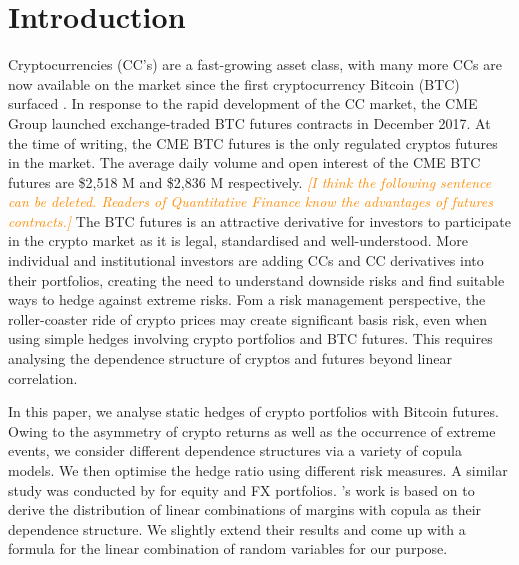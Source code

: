 \documentclass[11pt,a4paper,english]{article}
\providecommand{\natp}[1]{\textcolor{darkorange}{#1}}
\begin{document}
\section{Introduction}\label{sec:introduction}
Cryptocurrencies (CC's) are a fast-growing asset class,
with many more CCs are now available on the market since the first
cryptocurrency Bitcoin (BTC) surfaced \citep{nakamoto2009}.
In response to the rapid development of the CC market, the CME Group
launched exchange-traded BTC futures contracts in December
2017.
At the time of writing, the CME BTC futures is the only regulated cryptos futures in the market.
The average daily volume and open interest of the CME BTC futures are
\$2,518 M and \$2,836 M respectively.
\natp{\em [I think the following sentence can be deleted. Readers of
  Quantitative Finance know the advantages of futures contracts.]} The BTC futures is an attractive derivative for investors to participate in the crypto market as it is legal,
standardised and well-understood.
More individual and institutional investors are adding CCs and CC
derivatives into their portfolios, creating the need to understand
downside risks and find suitable ways to hedge against extreme risks. 
Fom a risk management perspective, the roller-coaster ride
of crypto prices may create significant basis risk, even when using
simple hedges involving crypto portfolios and BTC futures. This
requires analysing the dependence structure of cryptos and
futures beyond linear correlation. 

In this paper, we analyse static hedges of crypto portfolios
with Bitcoin futures. Owing to the asymmetry of crypto returns as
well as the occurrence of extreme events, we consider different 
dependence structures via a variety of copula models. We then optimise
the hedge ratio using different risk measures. A similar study was
conducted by \citep{barbi2014copula} for equity and FX portfolios.
\citet{barbi2014copula}'s work is based on \citet{cherubini2011copula}
to derive the distribution of linear combinations of margins with
copula as their dependence structure. We slightly extend their results 
and come up with a formula for the linear combination of random
variables for our purpose.
\end{document}
